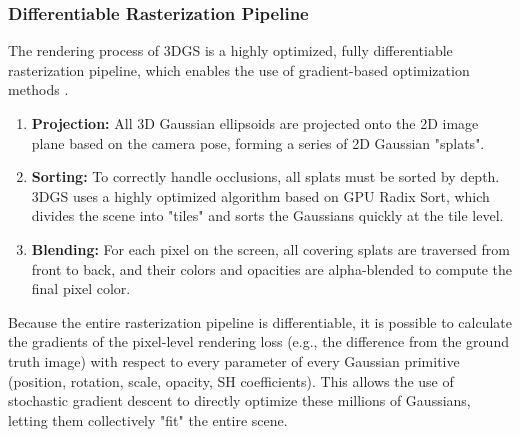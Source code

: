 \documentclass[11pt]{article}
\begin{document}
\subsubsection{Differentiable Rasterization Pipeline}
The rendering process of 3DGS is a highly optimized, fully differentiable rasterization pipeline, which enables the use of gradient-based optimization methods \cite{huggingface_3dgs}.
\begin{enumerate}
    \item \textbf{Projection:} All 3D Gaussian ellipsoids are projected onto the 2D image plane based on the camera pose, forming a series of 2D Gaussian "splats".
    \item \textbf{Sorting:} To correctly handle occlusions, all splats must be sorted by depth. 3DGS uses a highly optimized algorithm based on GPU Radix Sort, which divides the scene into "tiles" and sorts the Gaussians quickly at the tile level.
    \item \textbf{Blending:} For each pixel on the screen, all covering splats are traversed from front to back, and their colors and opacities are alpha-blended to compute the final pixel color.
\end{enumerate}
Because the entire rasterization pipeline is differentiable, it is possible to calculate the gradients of the pixel-level rendering loss (e.g., the difference from the ground truth image) with respect to every parameter of every Gaussian primitive (position, rotation, scale, opacity, SH coefficients). This allows the use of stochastic gradient descent to directly optimize these millions of Gaussians, letting them collectively "fit" the entire scene.
\end{document}
